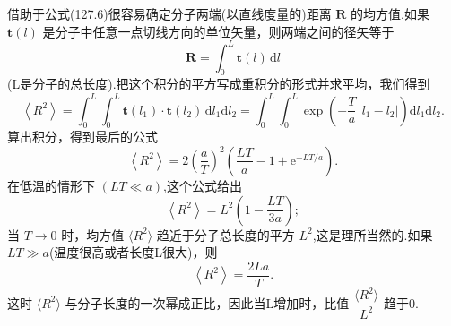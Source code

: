借助于公式(127.6)很容易确定分子两端(以直线度量的)距离 $\boldsymbol{R}$ 的均方值.如果 $\boldsymbol{t}(l)$ 是分子中任意一点切线方向的单位矢量，则两端之间的径矢等于
\begin{equation*}
  \boldsymbol{R}=\int_0^L\boldsymbol{t}(l)\,\mathrm{d}l
\end{equation*}
(L是分子的总长度).把这个积分的平方写成重积分的形式并求平均，我们得到
\begin{equation*}
  \left\langle R^2\right\rangle
  =\int_0^L\int_0^L\boldsymbol{t}(l_1)\cdot\boldsymbol{t}(l_2)\,\mathrm{d}l_1\mathrm{d}l_2
  =\int_0^L\int_0^L\exp\left(-\frac{T}{a}\,|l_1-l_2|\right)
  \mathrm{d}l_1\mathrm{d}l_2.
\end{equation*}
算出积分，得到最后的公式
\begin{equation}
  \left\langle R^2\right\rangle
  =2\left(\frac{a}{T}\right)^2
  \left(\frac{LT}{a}-1+\mathrm{e}^{-LT/a}\right).
\end{equation}
在低温的情形下 $(LT\ll a)$,这个公式给出
\begin{equation}
  \left\langle R^2\right\rangle=L^2\left(1-\frac{LT}{3a}\right);
\end{equation}
当 $T\to 0$ 时，均方值 $\langle R^2\rangle$ 趋近于分子总长度的平方 $L^2$,这是理所当然的.如果 $LT\gg a$(温度很高或者长度L很大)，则
\begin{equation}
  \left\langle R^2\right\rangle=\frac{2La}{T}.
\end{equation}
这时 $\langle R^2\rangle$ 与分子长度的一次幂成正比，因此当L增加时，比值 $\dfrac{\langle R^2\rangle}{L^2}$ 趋于0.
